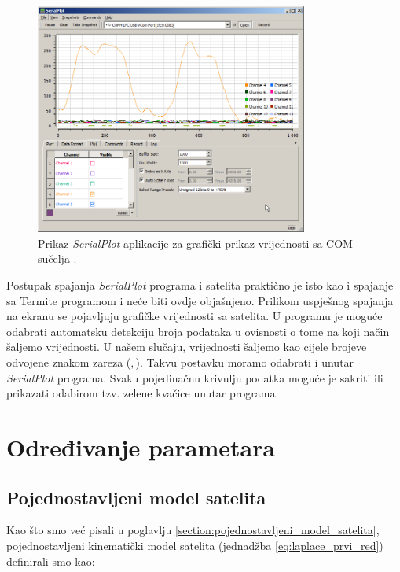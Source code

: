 \documentclass[times, utf8, diplomski, numeric]{templates/template}
\begin{document}
{{        \begin{figure}[htb]
        \centering
        \includegraphics[width=0.8\textwidth]{images/serialplot.png}
        \caption{Prikaz \emph{SerialPlot} aplikacije za grafički prikaz vrijednosti sa COM sučelja \cite{serialplot}.}
        \label{fig:serialplot}
        \end{figure}

        Postupak spajanja \emph{SerialPlot} programa i satelita praktično je isto kao i spajanje sa Termite programom i neće biti ovdje objašnjeno. Prilikom uspješnog spajanja na ekranu se pojavljuju grafičke vrijednosti sa satelita. U programu je moguće odabrati automatsku detekciju broja podataka u ovisnosti o tome na koji način šaljemo vrijednosti. U našem slučaju, vrijednosti šaljemo kao cijele brojeve odvojene znakom zareza ($,$). Takvu postavku moramo odabrati i unutar \emph{SerialPlot} programa. Svaku pojedinačnu krivulju podatka moguće je sakriti ili prikazati odabirom tzv. zelene kvačice unutar programa. 
    }

    \section{Određivanje parametara}{
        \subsection{Pojednostavljeni model satelita}{
        \label{subsection:kinematicki_model}
            Kao što smo već pisali u poglavlju \ref{section:pojednostavljeni_model_satelita}, pojednostavljeni kinematički model satelita (jednadžba \ref{eq:laplace_prvi_red}) definirali smo kao:

}}}
\end{document}
